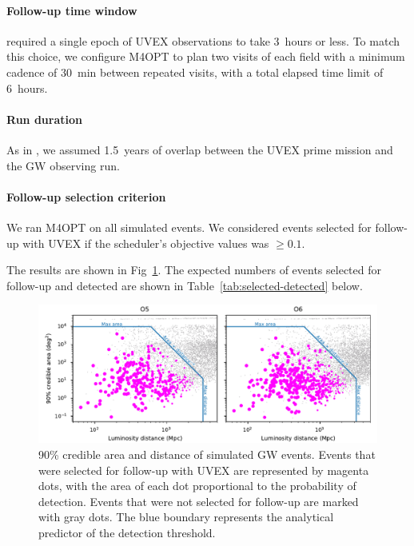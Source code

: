\documentclass[twocolumn,times]{aastex631}
\begin{document}
\paragraph{Follow-up time window}
\citet{criswell} required a single epoch of \ac{UVEX} observations to take 3~hours or less. To match this choice, we configure \ac{M4OPT} to plan two visits of each field with a minimum cadence of 30~min between repeated visits, with a total elapsed time limit of 6~hours. 

\paragraph{Run duration}
As in \citet{criswell}, we assumed 1.5~years of overlap between the \ac{UVEX} prime mission and the \ac{GW} observing run.

\paragraph{Follow-up selection criterion}
We ran \ac{M4OPT} on all simulated events. We considered events selected for follow-up with \ac{UVEX} if the scheduler's objective values was $\geq 0.1$.

The results are shown in Fig~\ref{fig:area-distance}. The expected numbers of events selected for follow-up and detected are shown in Table~\ref{tab:selected-detected} below.

\begin{figure}
    \includegraphics[width=\textwidth]{figures/area-distance}
    \caption{\label{fig:area-distance}90\% credible area and distance of simulated \ac{GW} events. Events that were selected for follow-up with \ac{UVEX} are represented by magenta dots, with the area of each dot proportional to the probability of detection. Events that were not selected for follow-up are marked with gray dots. The blue boundary represents the analytical predictor of the detection threshold.}
\end{figure}
\end{document}
